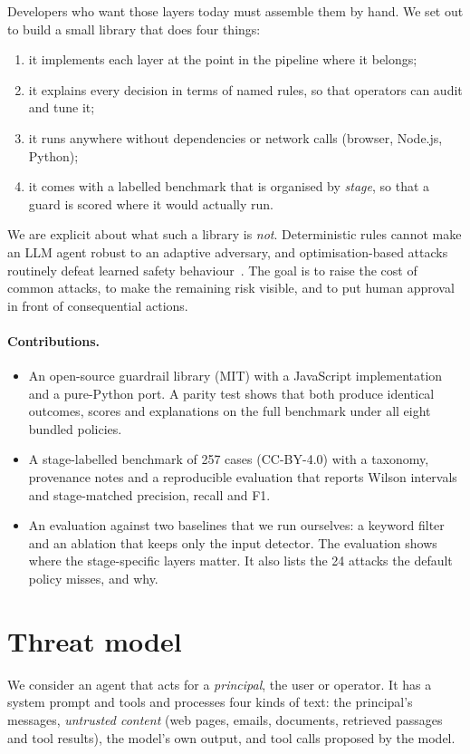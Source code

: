 \documentclass[10pt]{article}
\begin{document}
Developers who want those layers today must assemble them by hand. We set out to build a small library that does four things:
\begin{enumerate}
\item it implements each layer at the point in the pipeline where it belongs;
\item it explains every decision in terms of named rules, so that operators can audit and tune it;
\item it runs anywhere without dependencies or network calls (browser, Node.js, Python);
\item it comes with a labelled benchmark that is organised by \emph{stage}, so that a guard is scored where it would actually run.
\end{enumerate}
We are explicit about what such a library is \emph{not}. Deterministic rules cannot make an LLM agent robust to an adaptive adversary, and optimisation-based attacks routinely defeat learned safety behaviour~\citep{wei2023jailbroken,zou2023universal}. The goal is to raise the cost of common attacks, to make the remaining risk visible, and to put human approval in front of consequential actions.

\paragraph{Contributions.}
\begin{itemize}
\item An open-source guardrail library (MIT) with a JavaScript implementation and a pure-Python port. A parity test shows that both produce identical outcomes, scores and explanations on the full benchmark under all eight bundled policies.
\item A stage-labelled benchmark of 257 cases (CC-BY-4.0) with a taxonomy, provenance notes and a reproducible evaluation that reports Wilson intervals~\citep{wilson1927probable} and stage-matched precision, recall and F1.
\item An evaluation against two baselines that we run ourselves: a keyword filter and an ablation that keeps only the input detector. The evaluation shows where the stage-specific layers matter. It also lists the 24 attacks the default policy misses, and why.
\end{itemize}

\section{Threat model}
\label{sec:threat}
We consider an agent that acts for a \emph{principal}, the user or operator. It has a system prompt and tools and processes four kinds of text: the principal's messages, \emph{untrusted content} (web pages, emails, documents, retrieved passages and tool results), the model's own output, and tool calls proposed by the model.
\end{document}
